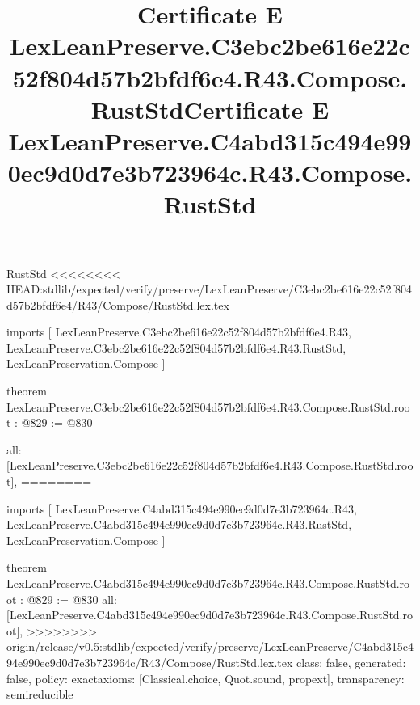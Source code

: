 \begin{lexlean}{RustStd}
<<<<<<<< HEAD:stdlib/expected/verify/preserve/LexLeanPreserve/C3ebc2be616e22c52f804d57b2bfdf6e4/R43/Compose/RustStd.lex.tex
\title{Certificate E LexLeanPreserve.C3ebc2be616e22c52f804d57b2bfdf6e4.R43.Compose.RustStd}
\begin{coremodule}
imports [
  LexLeanPreserve.C3ebc2be616e22c52f804d57b2bfdf6e4.R43,
  LexLeanPreserve.C3ebc2be616e22c52f804d57b2bfdf6e4.R43.RustStd,
  LexLeanPreservation.Compose
]

theorem LexLeanPreserve.C3ebc2be616e22c52f804d57b2bfdf6e4.R43.Compose.RustStd.root : @829 := @830 {
  all: [LexLeanPreserve.C3ebc2be616e22c52f804d57b2bfdf6e4.R43.Compose.RustStd.root],
========
\title{Certificate E LexLeanPreserve.C4abd315c494e990ec9d0d7e3b723964c.R43.Compose.RustStd}
\begin{coremodule}
imports [
  LexLeanPreserve.C4abd315c494e990ec9d0d7e3b723964c.R43,
  LexLeanPreserve.C4abd315c494e990ec9d0d7e3b723964c.R43.RustStd,
  LexLeanPreservation.Compose
]

theorem LexLeanPreserve.C4abd315c494e990ec9d0d7e3b723964c.R43.Compose.RustStd.root : @829 := @830 {
  all: [LexLeanPreserve.C4abd315c494e990ec9d0d7e3b723964c.R43.Compose.RustStd.root],
>>>>>>>> origin/release/v0.5:stdlib/expected/verify/preserve/LexLeanPreserve/C4abd315c494e990ec9d0d7e3b723964c/R43/Compose/RustStd.lex.tex
  class: false,
  generated: false,
  policy: exact{axioms: [Classical.choice, Quot.sound, propext]},
  transparency: semireducible
}


\end{coremodule}}
\end{coremodule}
\end{lexlean}
